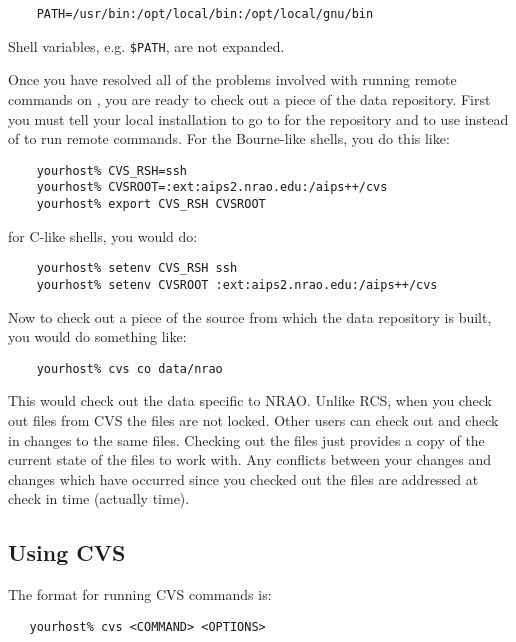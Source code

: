 \begin{verbatim}
    PATH=/usr/bin:/opt/local/bin:/opt/local/gnu/bin
\end{verbatim}

\noindent
Shell variables, e.g. \verb+$PATH+, are not expanded.

Once you have resolved all of the problems involved with running remote
commands on , you are ready to check out a piece
of the data repository. First you must tell your local 
installation to go to  for the repository and to
use  instead of  to run remote commands. For
the Bourne-like shells, you do this like:

\begin{verbatim}
    yourhost% CVS_RSH=ssh
    yourhost% CVSROOT=:ext:aips2.nrao.edu:/aips++/cvs
    yourhost% export CVS_RSH CVSROOT
\end{verbatim}

\noindent
for C-like shells, you would do:

\begin{verbatim}
    yourhost% setenv CVS_RSH ssh
    yourhost% setenv CVSROOT :ext:aips2.nrao.edu:/aips++/cvs
\end{verbatim}

Now to check out a piece of the source from which the data repository is
built, you would do something like:

\begin{verbatim}
    yourhost% cvs co data/nrao
\end{verbatim}

\noindent
This would check out the data specific to NRAO. Unlike RCS, when you check
out files from CVS the files are not locked. Other users can check out and
check in changes to the same files. Checking out the files just provides
a copy of the current state of the files to work with. Any conflicts
between your changes and changes which have occurred since you checked
out the files are addressed at check in time (actually 
time).

\subsection*{Using CVS}
\label{data repository using cvs}

The format for running CVS commands is:

\begin{verbatim}
   yourhost% cvs <COMMAND> <OPTIONS>
\end{verbatim}

